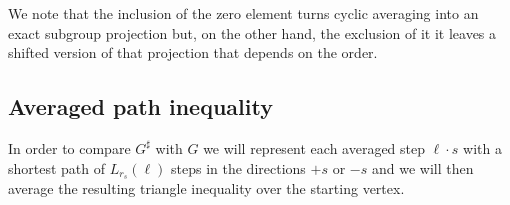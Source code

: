 \documentclass[11pt]{article}
\theoremstyle{definition}
\theoremstyle{remark}
\begin{document}

We note that the inclusion of the zero element turns cyclic averaging into an exact subgroup projection but, on the other hand, the exclusion of it it leaves a shifted  version of that projection that depends on the order.


\subsection{Averaged path inequality}
In order to compare $G^\sharp$ with $G$ we will represent each averaged step $\ell \cdot s$ with a shortest path of $L_{r_s}(\ell)$ steps in the directions $+s$ or $-s$ and we will then average the resulting triangle inequality over the starting vertex.

\end{document}
